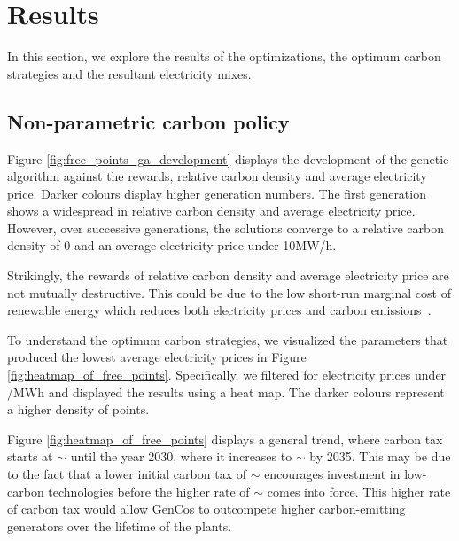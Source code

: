 \section{Results}
\label{carbonoptim:sec:results}



In this section, we explore the results of the optimizations, the optimum carbon strategies and the resultant electricity mixes.

\subsection{Non-parametric carbon policy}
\label{sssec:result_non_parametric_strategy}

Figure \ref{fig:free_points_ga_development} displays the development of the genetic algorithm against the rewards, relative carbon density and average electricity price. Darker colours display higher generation numbers. The first generation shows a widespread in relative carbon density and average electricity price. However, over successive generations, the solutions converge to a relative carbon density of 0 and an average electricity price under \textsterling10MW/h. 

Strikingly, the rewards of relative carbon density and average electricity price are not mutually destructive. This could be due to the low short-run marginal cost of renewable energy which reduces both electricity prices and carbon emissions~\cite{OMahoney2011}.





To understand the optimum carbon strategies, we visualized the parameters that produced the lowest average electricity prices in Figure \ref{fig:heatmap_of_free_points}. Specifically, we filtered for electricity prices under /MWh and displayed the results using a heat map. The darker colours represent a higher density of points. 

Figure \ref{fig:heatmap_of_free_points} displays a general trend, where carbon tax starts at ${\sim}$ until the year 2030, where it increases to ${\sim}$ by 2035. This may be due to the fact that a lower initial carbon tax of ${\sim}$ encourages investment in low-carbon technologies before the higher rate of ${\sim}$ comes into force. This higher rate of carbon tax would allow GenCos to outcompete higher carbon-emitting generators over the lifetime of the plants.





